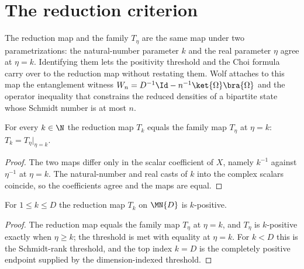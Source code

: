 \section{The reduction criterion}

The reduction map and the family $T_\eta$ are the same map under two
parametrizations: the natural-number parameter $k$ and the real parameter
$\eta$ agree at $\eta=k$. Identifying them lets the positivity threshold and
the Choi formula carry over to the reduction map without restating them. Wolf
attaches to this map the entanglement witness
$W_n=D^{-1}\Id-n^{-1}\ket{\Omega}\bra{\Omega}$ and the operator inequality
\cite[Equation~(3.18)]{Wolf2012Quantum} that constrains the reduced densities
of a bipartite state whose Schmidt number is at most $n$.

\begin{theorem}
    \label{thm:reduction_map_eq_t_eta}
    \leanok
    For every $k\in\N$ the reduction map $T_k$ equals the family map $T_\eta$ at
    $\eta=k$: $T_k=T_\eta\big|_{\eta=k}$.
\end{theorem}

\begin{proof}
    \leanok
    The two maps differ only in the scalar coefficient of $X$, namely $k^{-1}$
    against $\eta^{-1}$ at $\eta=k$. The natural-number and real casts of $k$
    into the complex scalars coincide, so the coefficients agree and the maps
    are equal.
\end{proof}

\begin{theorem}
    \label{thm:reduction_map_is_n_positive}
    \leanok
    For $1\le k\le D$ the reduction map $T_k$ on $\MN{D}$ is $k$-positive.
\end{theorem}

\begin{proof}
    \leanok
    The reduction map equals the family map $T_\eta$ at $\eta=k$, and $T_\eta$ is
    $k$-positive exactly when $\eta\ge k$; the threshold is met with equality at
    $\eta=k$. For $k<D$ this is the Schmidt-rank threshold, and the top index
    $k=D$ is the completely positive endpoint supplied by the dimension-indexed
    threshold.
\end{proof}

